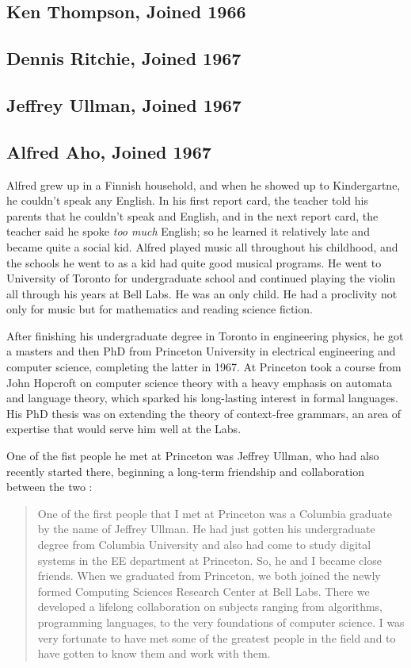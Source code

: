 \subsection{Ken Thompson, Joined 1966}



\subsection{Dennis Ritchie, Joined 1967}


\subsection{Jeffrey Ullman, Joined 1967}


\subsection{Alfred Aho, Joined 1967}

Alfred grew up in a Finnish household, and when he showed up to Kindergartne,
he couldn't speak any English.
In his first report card, the teacher told his parents that he couldn't speak and English,
and in the next report card, the teacher said he spoke \textit{too much} English;
so he learned it relatively late and became quite a social kid.
Alfred played music all throughout his childhood, and the schools he went to
as a kid had quite good musical programs.
He went to University of Toronto for undergraduate school and continued playing 
the violin all through his years at Bell Labs. He was an only child. He had a 
proclivity not only for music but for mathematics and reading science fiction.

After finishing his undergraduate degree in Toronto in engineering physics,
he got a masters and then PhD
from Princeton University in electrical engineering and computer science,
completing the latter in 1967.
At Princeton took a course from John Hopcroft on computer science theory with a heavy emphasis on
automata and language theory, which sparked his long-lasting interest in formal languages.
His PhD thesis was on extending the theory of context-free grammars, an area of
expertise that would serve him well at the Labs.

One of the fist people he met at Princeton was Jeffrey Ullman, who had also recently
started there, beginning a long-term friendship and collaboration between the two
\cite{aho_oral_history_2022}:

\begin{quotation}
    One of the first people that I met at Princeton was a Columbia graduate by the name of Jeffrey 
Ullman. He had just gotten his undergraduate degree from Columbia University and also had come to 
study digital systems in the EE department at Princeton. So, he and I became close friends. When we 
graduated from Princeton, we both joined the newly formed Computing Sciences Research Center at Bell 
Labs. There we developed a lifelong collaboration on subjects ranging from algorithms, programming 
languages, to the very foundations of computer science. I was very fortunate to have met some of the 
greatest people in the field and to have gotten to know them and work with them.
\end{quotation}

